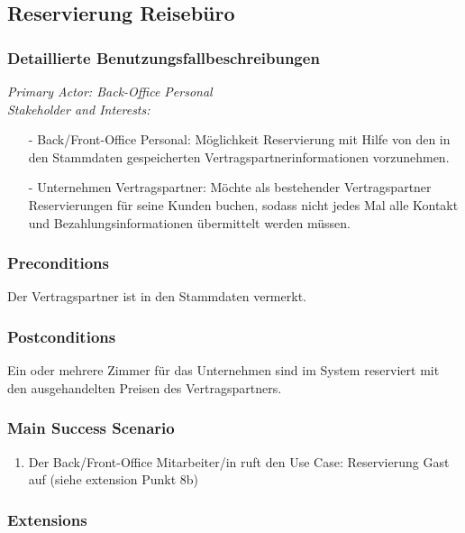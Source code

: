 \documentclass[./detailed_overview_usecases.tex]{subfiles}
\begin{document}
    \subsection{Reservierung Reisebüro}
    \subsubsection{Detaillierte Benutzungsfallbeschreibungen}

    \textit{Primary Actor: Back-Office Personal}
    \\
    \textit{Stakeholder and Interests:}
    \begin{itemize}
        \item[-] Back/Front-Office Personal: Möglichkeit Reservierung mit Hilfe von den in den Stammdaten gespeicherten Vertragspartnerinformationen vorzunehmen.
        \item[-] Unternehmen Vertragspartner: Möchte als bestehender Vertragspartner Reservierungen für seine Kunden buchen, sodass nicht jedes Mal alle Kontakt und Bezahlungsinformationen übermittelt werden müssen.
    \end{itemize}

    \subsubsection*{Preconditions}
    Der Vertragspartner ist in den Stammdaten vermerkt.

    \subsubsection*{Postconditions}
    Ein oder mehrere Zimmer für das Unternehmen sind im System reserviert mit den ausgehandelten Preisen des Vertragspartners.

    \subsubsection*{Main Success Scenario}
    \begin{enumerate}
        \item Der Back/Front-Office Mitarbeiter/in ruft den Use Case: Reservierung Gast auf (siehe extension Punkt 8b)
    \end{enumerate}

    \subsubsection*{Extensions}
    \item
\end{document}
